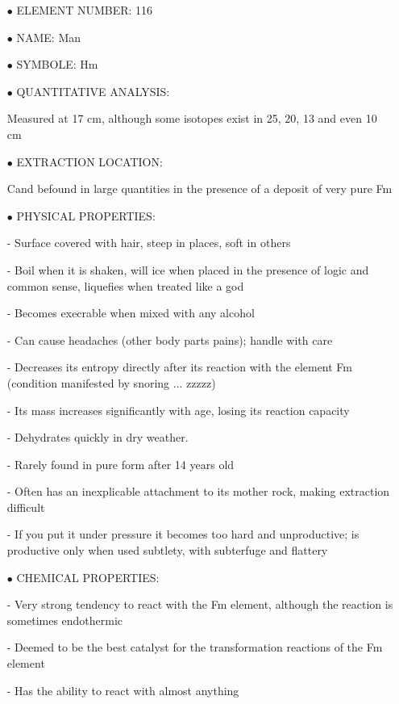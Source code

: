 \begin{itemize}
	\item[$\bullet$] ELEMENT NUMBER: 116

	\item[$\bullet$] NAME: Man

	\item[$\bullet$] SYMBOLE: Hm

	\item[$\bullet$] QUANTITATIVE ANALYSIS:	

Measured at 17 cm, although some isotopes exist in 25, 20, 13 and even 10 cm

	\item[$\bullet$] EXTRACTION LOCATION:	

Cand befound in large quantities in the presence of a deposit of very pure Fm

	\item[$\bullet$] PHYSICAL PROPERTIES:

- Surface covered with hair, steep in places, soft in others

- Boil when it is shaken, will ice when placed in the presence of logic and common sense, liquefies when treated like a god

- Becomes execrable when mixed with any alcohol

- Can cause headaches (other body parts pains); handle with care

- Decreases its entropy directly after its reaction with the element Fm (condition manifested by snoring ... zzzzz)

- Its mass increases significantly with age, losing its reaction capacity

- Dehydrates quickly in dry weather.

- Rarely found in pure form after 14 years old

- Often has an inexplicable attachment to its mother rock, making extraction difficult

- If you put it under pressure it becomes too hard and unproductive; is productive only when used subtlety, with subterfuge and flattery

	\item[$\bullet$] CHEMICAL PROPERTIES:

- Very strong tendency to react with the Fm element, although the reaction is sometimes endothermic

- Deemed to be the best catalyst for the transformation reactions of the Fm element

- Has the ability to react with almost anything


\end{itemize}
